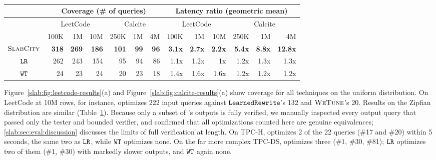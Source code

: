 



\begin{table}[!t]
\footnotesize
\caption{}
\vspace{-8pt}
\centering
\setlength{\tabcolsep}{2pt}
\def\arraystretch{1.1}
\begin{tabular}{  c | r r r | r r r | r r r | r r r }
\toprule
& \multicolumn{6}{c|}{Coverage (\# of queries)} 
& \multicolumn{6}{c}{Latency ratio (geometric mean)} 
\\ 
\midrule
& \multicolumn{3}{c|}{LeetCode} 
& \multicolumn{3}{c|}{Calcite} 
& \multicolumn{3}{c|}{LeetCode} 
& \multicolumn{3}{c}{Calcite} 
\\ 
& 100K & 1M & 10M 
& 250K & 1M & 4M 
& 100K & 1M & 10M 
& 250K & 1M & 4M 
\\ 
\midrule
$\textsc{SlabCity}$
& \textbf{318} & \textbf{269} & \textbf{186}
& {\textbf{101}} & {\textbf{99}} & {\textbf{96}}
& \textbf{3.1x} & \textbf{2.7x} & \textbf{2.2x}
& {\textbf{5.4x}} & {\textbf{8.8x}} & {\textbf{12.8x}}
\\ 
$\texttt{LR}$
& 262 & 243 & 154  
& {95} & {94} & {86} 
& 1.1x & 1.2x & 1x
& {1.2x} & {1.3x} & {1.3x}

\\ 
$\texttt{WT}$
& 24 & 23 & 24  
& {20} & {23} & {18}
& 1.4x & 1.6x & 1.6x
& {1.2x} & {1.2x} & {1.2x}
\\ 
\bottomrule
\end{tabular}

\label{slab:tab:zipfian-results}
\vspace{-15pt}
\end{table}

Figure~\ref{slab:fig:leetcode-results}(a) and
Figure~\ref{slab:fig:calcite-results}(a) show coverage for all
techniques on the uniform distribution. On LeetCode at 10M rows, for
instance, \toolname optimizes 222 input queries against
$\texttt{LearnedRewrite}$'s 132 and $\textsc{WeTune}$'s 20. Results on the Zipfian
distribution are similar (Table~\ref{slab:tab:zipfian-results}).
Because only a subset of \toolname's outputs is fully verified, we
manually inspected every output query that passed only the tester and
bounded verifier, and confirmed that all optimizations counted here
are genuine equivalences; \cref{slab:sec:eval:discussion} discusses
the limits of full verification at length. On TPC-H, \toolname
optimizes 2 of the 22 queries (\#17 and \#20) within 5 seconds, the
same two as $\texttt{LR}$, while $\texttt{WT}$ optimizes none. On the far more
complex TPC-DS, \toolname optimizes three (\#1, \#30, \#81); $\texttt{LR}$
optimizes two of them (\#1, \#30) with markedly slower outputs, and
$\texttt{WT}$ again none.

